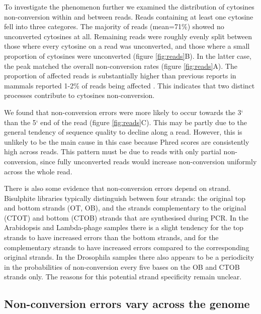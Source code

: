 \documentclass[12pt,longbibliography]{article}
\begin{document}
To investigate the phenomenon further we examined the distribution of cytosines non-conversion within and between reads.
Reads containing at least one cytosine fell into three categores.
The majority of reads (mean=71\%) showed no unconverted cytosines at all.
Remaining reads were roughly evenly split between those where every cytosine on a read was unconverted, and those where a small proportion of cytosines were unconverted (figure \ref{fig:reads}B).
In the latter case, the peak matched the overall non-conversion rates (figure \ref{fig:reads}A).
The proportion of affected reads is substantially higher than previous reports in mammals reported 1-2\% of reads being affected \parencite{lu2015improved, suzuki2018whole}.
This indicates that two distinct processes contribute to cytosines non-conversion.

We found that non-conversion errors were more likely to occur towards the 3` than the 5` end of the read (figure \ref{fig:reads}C).
This may be partly due to the general tendency of sequence quality to decline along a read.
However, this is unlikely to be the main cause in this case because Phred scores are consistently high across reads.
This pattern must be due to reads with only partial non-conversion, since fully unconverted reads would increase non-conversion uniformly across the whole read.

There is also some evidence that non-conversion errors depend on strand.
Bisulphite libraries typically distinguish between four strands: the original top and bottom strands (OT, OB), and the strands complementary to the original (CTOT) and bottom (CTOB) strands that are synthesised during PCR.
In the Arabidopsis and Lambda-phage samples there is a slight tendency for the top strands to have increased errors than the bottom strands, and for the complementary strands to have increased errors compared to the corresponding original strands.
In the Drosophila samples there also appears to be a periodicity in the probabilities of non-conversion every five bases on the OB and CTOB strands only.
The reasons for this potential strand specificity remain unclear.


\subsection{Non-conversion errors vary across the genome}
\end{document}
